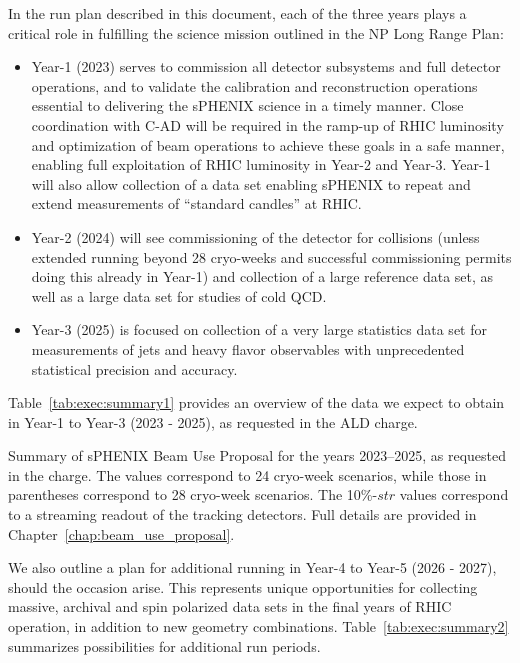 In the run plan described in this document, each of the three years
plays a critical role in fulfilling the science mission outlined in
the NP Long Range Plan:
\begin{itemize}
\item Year-1 (2023) serves to commission all detector subsystems and full
  detector operations, and to validate the calibration and
  reconstruction operations essential to delivering the sPHENIX
  science in a timely manner. Close coordination with C-AD will be
  required in the ramp-up of RHIC luminosity and optimization of beam
  operations to achieve these goals in a safe manner, enabling full
  exploitation of RHIC luminosity in Year-2 and Year-3. Year-1 will
  also allow collection of a \auau data set enabling sPHENIX to repeat
  and extend measurements of ``standard candles'' at RHIC.
\item Year-2 (2024) will see commissioning of the detector for \pp collisions
  (unless extended running beyond 28 cryo-weeks and successful \auau
  commissioning permits doing this already in Year-1) and collection
  of a large \pp reference data set, as well as a large \pAu data set
  for studies of cold QCD.
\item Year-3 (2025) is focused on collection of a very large statistics \auau
  data set for measurements of jets and heavy flavor observables with
  unprecedented statistical precision and accuracy.
\end{itemize}

Table~\ref{tab:exec:summary1} provides an overview of the data we
expect to obtain in Year-1 to Year-3 (2023 - 2025), as requested in the ALD charge.

\begin{table}[hbt!]
\centering
\caption{\label{tab:exec:summary1} Summary of sPHENIX Beam Use Proposal for the years
  2023--2025, as requested in the charge.  The values correspond to 24 cryo-week scenarios, while those in parentheses correspond to 28 cryo-week scenarios.    The 10\%-$str$ values correspond to a streaming readout of the tracking detectors.
  Full details are provided in
  Chapter~\ref{chap:beam_use_proposal}.} 
\bigskip \centering 
\end{table}

We also outline a plan for additional running in Year-4 to Year-5 (2026 - 2027), should the occasion
arise. This represents unique opportunities for collecting massive,
archival \apa and spin polarized \pp data sets in the final years of
RHIC operation, in addition to new geometry combinations.  Table~\ref{tab:exec:summary2} summarizes possibilities for additional run periods.

